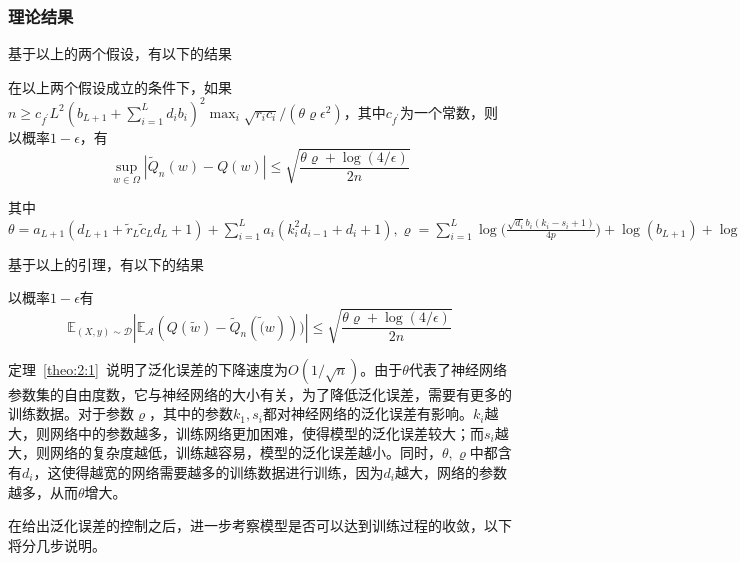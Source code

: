 \subsubsection{理论结果}
\par
基于以上的两个假设，有以下的结果
\begin{lemma}
在以上两个假设成立的条件下，如果$n\geq c_{f^\prime}L^2(b_{L+1}+\sum_{i=1}^L d_i b_i)^2 \max_i \sqrt{r_ic_i}/(\theta \varrho \epsilon^2)$，其中$c_{f^\prime}$为一个常数，则以概率$1-\epsilon$，有
\begin{equation}
\sup_{w\in \Omega} |\tilde{Q}_n(w)-Q(w)|\leq \sqrt{\frac{\theta \varrho +\log(4/\epsilon)}{2n}}
\end{equation}
\par
其中$\theta = a_{L+1}(d_{L+1}+\tilde{r}_L\tilde{c}_Ld_L+1)+\sum_{i=1}^L a_i(k_i^2d_{i-1}+d_i+1),  \varrho = \sum_{i=1}^L \log\big(\frac{\sqrt{d_i}b_i(k_i-s_i+1)}{4p}\big)+\log(b_{L+1}) + \log{\frac{n}{128p^2}}$
\end{lemma}
\par
基于以上的引理，有以下的结果
\begin{theorem}\label{theo:2:1}
以概率$1-\epsilon$有
\[
\mathbb{E}_{(X,y)\sim \mathcal{D}}|\mathbb{E}_{\mathcal{A}}(Q(\tilde{w}) - \tilde{Q}_n(\tilde(w)))| \leq \sqrt{\frac{\theta \varrho + \log(4/\epsilon)}{2n}}
\]
\end{theorem}

\par
定理~\ref{theo:2:1}~说明了泛化误差的下降速度为$O(1/\sqrt{n})$。由于$\theta$代表了神经网络参数集的自由度数，它与神经网络的大小有关，为了降低泛化误差，需要有更多的训练数据。对于参数$\varrho$，其中的参数$k_1,s_i$都对神经网络的泛化误差有影响。$k_i$越大，则网络中的参数越多，训练网络更加困难，使得模型的泛化误差较大；而$s_i$越大，则网络的复杂度越低，训练越容易，模型的泛化误差越小。同时，$\theta, \varrho$中都含有$d_i$，这使得越宽的网络需要越多的训练数据进行训练，因为$d_i$越大，网络的参数越多，从而$\theta$增大。

\par
在给出泛化误差的控制之后，进一步考察模型是否可以达到训练过程的收敛，以下将分几步说明。

